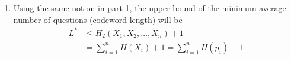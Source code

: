 \begin{exercise}
\begin{solution}
\begin{enumerate}
{    }
    \item { Using the same notion in part 1, the upper bound of the minimum average number of questions (codeword length) will be
    \begin{equation}
      \begin{aligned}
        L^* &\le H_2 (X_1,X_2,\ldots,X_n) + 1 \\
        &= \sum_{i=1}^{n} H(X_i) + 1 = \sum_{i=1}^{n} H(p_i) + 1
      \end{aligned}
    \end{equation}

    }
  \end{enumerate}
  \end{solution}
  \label{ex6}
\end{exercise}

